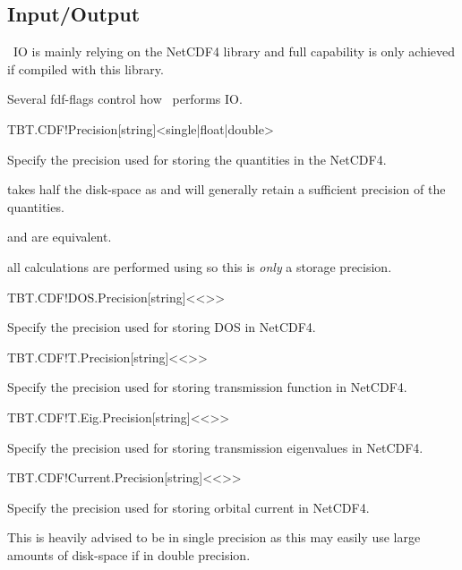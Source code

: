 \subsection{Input/Output}

\tbtrans\ IO is mainly relying on the NetCDF4 library and full
capability is only achieved if compiled with this library.

Several fdf-flags control how \tbtrans\ performs IO.


\begin{fdfentry}{TBT.CDF!Precision}[string]<single|float|double>

  Specify the precision used for storing the quantities in the
  NetCDF4.

   takes half the disk-space as  and will
  generally retain a sufficient precision of the quantities. 

   and  are equivalent.

  \note all calculations are performed using  so this is
  \emph{only} a storage precision.
  
\end{fdfentry}

\begin{fdfentry}{TBT.CDF!DOS.Precision}[string]<{<>}>

  Specify the precision used for storing DOS in NetCDF4.

\end{fdfentry}

\begin{fdfentry}{TBT.CDF!T.Precision}[string]<{<>}>

  Specify the precision used for storing transmission function in NetCDF4.

\end{fdfentry}

\begin{fdfentry}{TBT.CDF!T.Eig.Precision}[string]<{<>}>

  Specify the precision used for storing transmission eigenvalues in NetCDF4.
  
\end{fdfentry}

\begin{fdfentry}{TBT.CDF!Current.Precision}[string]<{<>}>

  Specify the precision used for storing orbital current in NetCDF4.

  \note This is heavily advised to be in single precision as this may
  easily use large amounts of disk-space if in double precision.
  
\end{fdfentry}

